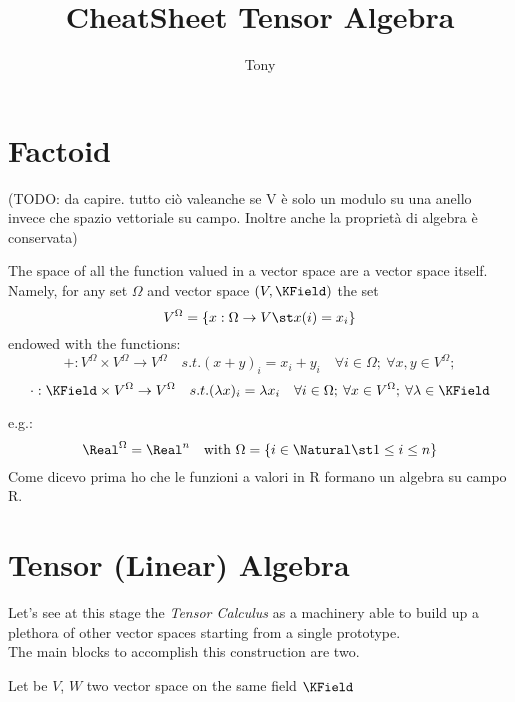 \documentclass[a4paper,10pt]{scrartcl}
\title{CheatSheet Tensor Algebra}
\author{Tony}
\begin{document}
\maketitle


\section{Factoid}\label{factoid}
(TODO: da capire. tutto ciò valeanche se V è solo un modulo su una anello invece che spazio vettoriale su campo. Inoltre anche la proprietà di algebra è conservata)

The space of all the function valued in a vector space are a vector space itself.
\\
Namely, for any set $\Omega$ and vector space $(V,\KField)$ the set 
\begin{displaymath}
 V^\Omega = \{ x : \Omega \rightarrow V \st x(i) = x_i \} 
\end{displaymath}
endowed with the functions:
\begin{displaymath}
 +: V^\Omega \times V^\Omega \rightarrow V^\Omega \quad s.t. (x+y)_i = x_i +y_i \quad \forall i \in \Omega;\: \forall x,y \in V^\Omega;
\end{displaymath}
\begin{displaymath}
 \cdot : \KField	\times V^\Omega \rightarrow V^\Omega \quad s.t. (\lambda x)_i = \lambda x_i \quad \forall i \in \Omega;\: \forall x \in V^\Omega; \: \forall \lambda \in \KField
\end{displaymath}

e.g.:
\begin{displaymath}
 \Real^\Omega = \Real^n \quad \textrm{with } \Omega= \{i \in \Natural \st 1 \leq i \leq n \}
\end{displaymath}
Come dicevo prima ho che le funzioni a valori in R formano un algebra su campo R.

\section{Tensor (Linear) Algebra}
Let's see at this stage the \emph{Tensor Calculus} as a machinery able to build up a plethora of other vector spaces starting from a single prototype.\\
The main blocks to accomplish this construction are two.

Let be $V$, $W$ two vector space on the same field $\KField$
\end{document}
